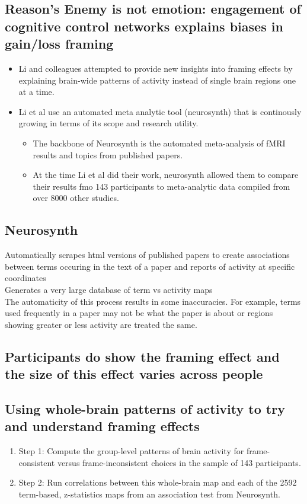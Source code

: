 \subsection{Reason's Enemy is not emotion: engagement of cognitive control networks explains biases in gain/loss framing}
\begin{itemize}
    \item Li and colleagues attempted to provide new insights into framing effects by explaining brain-wide patterns of activity instead of single brain regions one at a time.
    \item Li et al use an automated meta analytic tool (neurosynth) that is continously growing in terms of its scope and research utility.
    \begin{itemize}
        \item The backbone of Neurosynth is the automated meta-analysis of fMRI results and topics from published papers.
        \item At the time Li et al did their work, neurosynth allowed them to compare their results fmo 143 participants to meta-analytic data compiled from over 8000 other studies.
    \end{itemize}
\end{itemize}

\subsection{Neurosynth}
Automatically scrapes html versions of published papers to create associations between terms occuring in the text of a paper and reports of activity at specific coordinates
\\Generates a very large database of term vs activity maps
\\The automaticity of this process results in some inaccuracies. For example, terms used frequently in a paper may not be what the paper is about or regions showing greater or less activity are treated the same.

\subsection{Participants do show the framing effect and the size of this effect varies across people}
\subsection{Using whole-brain patterns of activity to try and understand framing effects}
\begin{enumerate}
    \item Step 1: Compute the group-level patterns of brain activity for frame-consistent versus frame-inconsistent choices in the sample of 143 participants.
    \item Step 2: Run correlations between this whole-brain map and each of the 2592 term-based, z-statistics maps from an association test from Neurosynth.
\end{enumerate}

